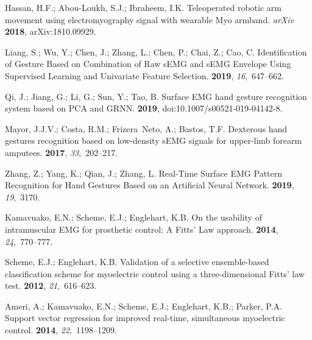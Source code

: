 \documentclass[sensors,review,accept,moreauthors,pdftex]{Definitions/mdpi}
\begin{document}
\begin{thebibliography}{999}
Hassan, H.F.; Abou-Loukh, S.J.; Ibraheem, I.K.
\newblock Teleoperated robotic arm movement using electromyography signal with
  wearable Myo armband.   \emph{arXiv}  \textbf{2018}, arXiv:1810.09929.

Liang, S.; Wu, Y.; Chen, J.; Zhang, L.; Chen, P.; Chai, Z.; Cao, C.
\newblock Identification of Gesture Based on Combination of Raw sEMG and sEMG
  Envelope Using Supervised Learning and Univariate Feature Selection.
 {\bf 2019}, {\em 16},~647--662.

Qi, J.; Jiang, G.; Li, G.; Sun, Y.; Tao, B.
\newblock Surface EMG hand gesture recognition system based on PCA and GRNN.
 {\bf 2019}, doi:10.1007/s00521-019-04142-8.

Mayor, J.J.V.; Costa, R.M.; Frizera~Neto, A.; Bastos, T.F.
\newblock Dexterous hand gestures recognition based on low-density sEMG signals
  for upper-limb forearm amputees.
 {\bf 2017}, {\em
  33},~202--217.

Zhang, Z.; Yang, K.; Qian, J.; Zhang, L.
\newblock Real-Time Surface EMG Pattern Recognition for Hand Gestures Based on
  an Artificial Neural Network.
 {\bf 2019}, {\em 19},~3170.

Kamavuako, E.N.; Scheme, E.J.; Englehart, K.B.
\newblock On the usability of intramuscular EMG for prosthetic control: A
  Fitts’ Law approach.
 {\bf 2014}, {\em
  24},~770--777.

Scheme, E.J.; Englehart, K.B.
\newblock Validation of a selective ensemble-based classification scheme for
  myoelectric control using a three-dimensional Fitts' law test.
 {\bf 2012}, {\em 21},~616--623.

Ameri, A.; Kamavuako, E.N.; Scheme, E.J.; Englehart, K.B.; Parker, P.A.
\newblock Support vector regression for improved real-time, simultaneous
  myoelectric control.
 {\bf 2014}, {\em 22},~1198--1209.


\end{thebibliography}
\end{document}
